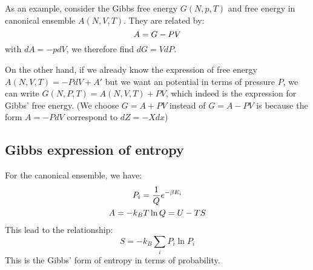 \documentclass{article}
\begin{document}
As an example, consider the Gibbs free energy $G(N,p,T)$ and free energy in canonical ensemble
$A(N,V,T)$. They are related by:
\begin{equation}
    A = G - PV \notag
\end{equation}
with $dA = -pdV$, we therefore find $dG = VdP$. 

On the other hand, if we already know the expression of free energy $A(N,V,T) = - PdV  + A'$ but we want an potential
in terms of pressure $P$, we can write $G(N,P,T) = A(N,V,T) + PV$, which indeed is the expression for Gibbs' free energy. (We choose 
$G = A + PV$ instead of $G = A - PV$ is because the form $A = -PdV$ correspond to $dZ = -Xdx$)

\subsection{Gibbs expression of entropy}
For the canonical ensemble, we have:
\begin{gather}
    P_i = \frac{1}{Q} e^{-\beta E_i} \notag \\
    A = -k_B T\ln Q = U - TS \notag
\end{gather}
This lead to the relationship:
\begin{equation}
    S = -k_B \sum_i P_i \ln P_i
\end{equation}
This is the Gibbs' form of entropy in terms of probability.

\pagebreak
\end{document}
